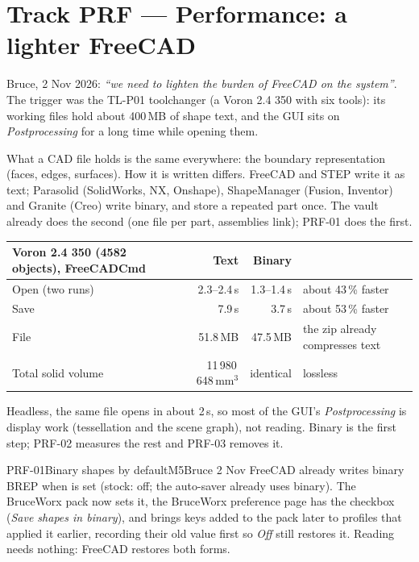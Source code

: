 \section{Track PRF --- Performance: a lighter FreeCAD}\label{sec:prf}

Bruce, 2 Nov 2026: \emph{``we need to lighten the burden of FreeCAD on the system''}. The trigger was the
TL-P01 toolchanger (a Voron 2.4 350 with six tools): its working files hold about 400\,MB of shape text, and
the GUI sits on \emph{Postprocessing} for a long time while opening them.

What a CAD file holds is the same everywhere: the boundary representation (faces, edges, surfaces). How it is
written differs. FreeCAD and STEP write it as text; Parasolid (SolidWorks, NX, Onshape), ShapeManager (Fusion,
Inventor) and Granite (Creo) write binary, and store a repeated part once. The vault already does the second
(one file per part, assemblies link); PRF-01 does the first.

\begin{center}\small
\begin{tabular}{@{}lrrl@{}}
\toprule
Voron 2.4 350 (4582 objects), FreeCADCmd & Text & Binary & \\
\midrule
Open (two runs) & 2.3--2.4\,s & 1.3--1.4\,s & about 43\,\% faster \\
Save & 7.9\,s & 3.7\,s & about 53\,\% faster \\
File & 51.8\,MB & 47.5\,MB & the zip already compresses text \\
Total solid volume & 11\,980\,648\,mm$^3$ & identical & lossless \\
\bottomrule
\end{tabular}
\end{center}

Headless, the same file opens in about 2\,s, so most of the GUI's \emph{Postprocessing} is display work
(tessellation and the scene graph), not reading. Binary is the first step; PRF-02 measures the rest and PRF-03
removes it.

\begin{epic}{PRF-01}{Binary shapes by default}{M5}{\stProg}{Bruce 2 Nov}
FreeCAD already writes binary BREP when  is set (stock: off;
the auto-saver already uses binary). The BruceWorx pack now sets it, the BruceWorx preference page has the
checkbox (\emph{Save shapes in binary}), and  brings keys added to the pack later
to profiles that applied it earlier, recording their old value first so \emph{Off} still restores it. Reading
needs nothing: FreeCAD restores both forms.
\end{epic}

